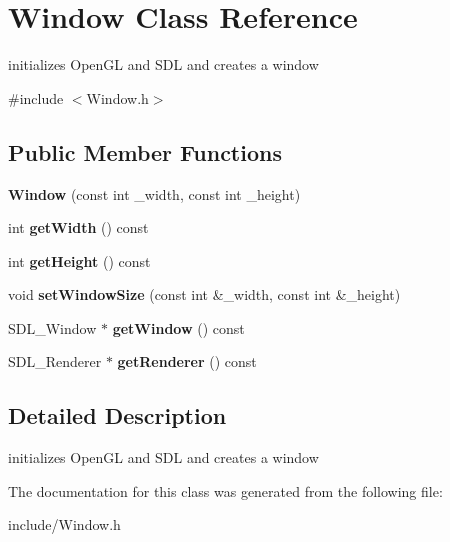 \hypertarget{classWindow}{}\section{Window Class Reference}
\label{classWindow}


initializes Open\+GL and S\+DL and creates a window  




{\ttfamily \#include $<$Window.\+h$>$}

\subsection*{Public Member Functions}
\begin{DoxyCompactItemize}
\item 
{\bfseries Window} (const int \+\_\+width, const int \+\_\+height)\hypertarget{classWindow_a7a2b8f008b7abfbb094e919e11340b54}{}\label{classWindow_a7a2b8f008b7abfbb094e919e11340b54}

\item 
int {\bfseries get\+Width} () const \hypertarget{classWindow_ad6c886b8b3b4034c2ad034bba30e4244}{}\label{classWindow_ad6c886b8b3b4034c2ad034bba30e4244}

\item 
int {\bfseries get\+Height} () const \hypertarget{classWindow_ab212a935b7e5bb15fe5bc1784725c1b1}{}\label{classWindow_ab212a935b7e5bb15fe5bc1784725c1b1}

\item 
void {\bfseries set\+Window\+Size} (const int \&\+\_\+width, const int \&\+\_\+height)\hypertarget{classWindow_acab1d14669c60a860b7b309b019f3d66}{}\label{classWindow_acab1d14669c60a860b7b309b019f3d66}

\item 
S\+D\+L\+\_\+\+Window $\ast$ {\bfseries get\+Window} () const \hypertarget{classWindow_adf523e859cb409c999bc8f349b879afb}{}\label{classWindow_adf523e859cb409c999bc8f349b879afb}

\item 
S\+D\+L\+\_\+\+Renderer $\ast$ {\bfseries get\+Renderer} () const \hypertarget{classWindow_af2bcfa04cbce391c7a31fe30aa8511b7}{}\label{classWindow_af2bcfa04cbce391c7a31fe30aa8511b7}

\end{DoxyCompactItemize}


\subsection{Detailed Description}
initializes Open\+GL and S\+DL and creates a window 

The documentation for this class was generated from the following file\+:\begin{DoxyCompactItemize}
\item 
include/Window.\+h\end{DoxyCompactItemize}
